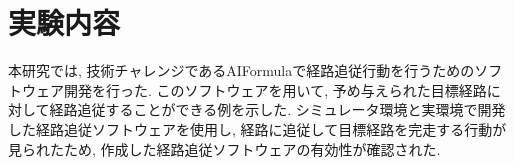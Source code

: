\section{実験内容}

本研究では, 技術チャレンジであるAIFormulaで経路追従行動を行うためのソフトウェア開発を行った.
このソフトウェアを用いて, 予め与えられた目標経路に対して経路追従することができる例を示した.
シミュレータ環境と実環境で開発した経路追従ソフトウェアを使用し, 経路に追従して目標経路を完走する行動が見られたため, 作成した経路追従ソフトウェアの有効性が確認された.